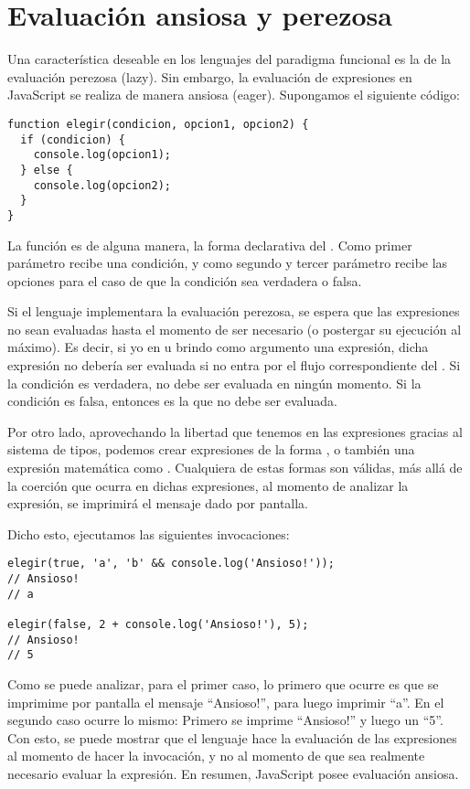 \section{Evaluación ansiosa y perezosa}

Una característica deseable en los lenguajes del paradigma funcional es la de la evaluación perezosa (lazy). Sin embargo, la evaluación de expresiones en JavaScript se realiza de manera ansiosa (eager). Supongamos el siguiente código:

\begin{lstlisting}[title={Creando una función condicional}]
function elegir(condicion, opcion1, opcion2) {
  if (condicion) {
    console.log(opcion1);
  } else {
    console.log(opcion2);
  }
}
\end{lstlisting}

La función  es de alguna manera, la forma declarativa del . Como primer parámetro recibe una condición, y como segundo y tercer parámetro recibe las opciones para el caso de que la condición sea verdadera o falsa.

Si el lenguaje implementara la evaluación perezosa, se espera que las expresiones no sean evaluadas hasta el momento de ser necesario (o postergar su ejecución al máximo). Es decir, si yo en  u  brindo como argumento una expresión, dicha expresión no debería ser evaluada si no entra por el flujo correspondiente del . Si la condición es verdadera,  no debe ser evaluada en ningún momento. Si la condición es falsa, entonces es  la que no debe ser evaluada.

Por otro lado, aprovechando la libertad que tenemos en las expresiones gracias al sistema de tipos, podemos crear expresiones de la forma , o también una expresión matemática como . Cualquiera de estas formas son válidas, más allá de la coerción que ocurra en dichas expresiones, al momento de analizar la expresión, se imprimirá el mensaje dado por pantalla.

Dicho esto, ejecutamos las siguientes invocaciones:

\begin{lstlisting}[title={Analizando resultados de las invocaciones}]
elegir(true, 'a', 'b' && console.log('Ansioso!'));
// Ansioso!
// a

elegir(false, 2 + console.log('Ansioso!'), 5);
// Ansioso!
// 5
\end{lstlisting}

Como se puede analizar, para el primer caso, lo primero que ocurre es que se imprimime por pantalla el mensaje "`Ansioso!"', para luego imprimir "`a"'. En el segundo caso ocurre lo mismo: Primero se imprime "`Ansioso!"' y luego un "`5"'. Con esto, se puede mostrar que el lenguaje hace la evaluación de las expresiones al momento de hacer la invocación, y no al momento de que sea realmente necesario evaluar la expresión. En resumen, JavaScript posee evaluación ansiosa.

